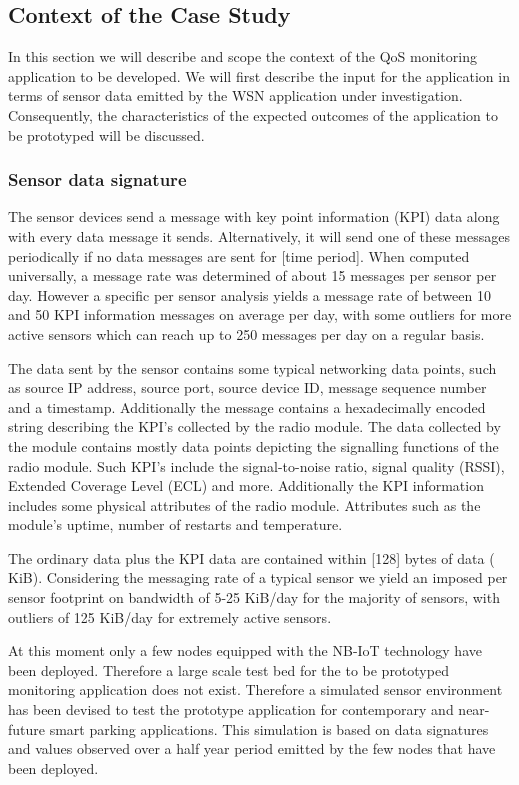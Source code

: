 \subsection{Context of the Case Study}
In this section we will describe and scope the context of the QoS monitoring application to be developed. We will first describe the input for the application in terms of sensor data emitted by the WSN application under investigation. Consequently, the characteristics of the expected outcomes of the application to be prototyped will be discussed. 

\subsubsection{Sensor data signature}
The sensor devices send a message with key point information (KPI) data along with every data message it sends. Alternatively, it will send one of these messages periodically if no data messages are sent for [time period]. When computed universally, a message rate was determined of about 15 messages per sensor per day. However a specific per sensor analysis yields a message rate of between 10 and 50 KPI information messages on average per day, with some outliers for more active sensors which can reach up to 250 messages per day on a regular basis.

The data sent by the sensor contains some typical networking data points, such as source IP address, source port, source device ID, message sequence number and a timestamp. Additionally the message contains a hexadecimally encoded string describing the KPI's collected by the \ublox radio module. The data collected by the \ublox module contains mostly data points depicting the signalling functions of the radio module. Such KPI's include the signal-to-noise ratio, signal quality (RSSI), Extended Coverage Level (ECL)  and more. Additionally the KPI information includes some physical attributes of the radio module. Attributes such as the module's uptime, number of restarts and temperature. 

The ordinary data plus the \ublox KPI data are contained within [128] bytes of data ( KiB). Considering the messaging rate of a typical sensor we yield an imposed per sensor footprint on bandwidth of 5-25 KiB/day for the majority of sensors, with outliers of 125 KiB/day for extremely active sensors.

At this moment only a few nodes equipped with the NB-IoT technology have been deployed. Therefore a large scale test bed for the to be prototyped monitoring application does not exist. Therefore a simulated sensor environment has been devised to test the prototype application for contemporary and near-future smart parking applications. This simulation is based on data signatures and values observed over a half year period emitted by the few nodes that have been deployed.


